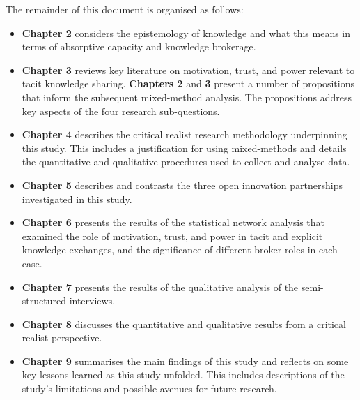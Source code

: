The remainder of this document is organised as follows:

\begin{itemize}[leftmargin=0pt]
    \item[] \textbf{Chapter 2} considers the epistemology of knowledge and what this means in terms of absorptive capacity and knowledge brokerage.
    \item[] \textbf{Chapter 3} reviews key literature on motivation, trust, and power relevant to tacit knowledge sharing. \textbf{Chapters 2} and \textbf{3} present a number of propositions that inform the subsequent mixed-method analysis. The propositions address key aspects of the four research sub-questions. 
    
    \item[] \textbf{Chapter 4} describes the critical realist research methodology underpinning this study. This includes a justification for using mixed-methods and details the quantitative and qualitative procedures used to collect and analyse data.
    \item[] \textbf{Chapter 5} describes and contrasts the three open innovation partnerships investigated in this study.
    \item[] \textbf{Chapter 6} presents the results of the statistical network analysis that examined the role of motivation, trust, and power in tacit and explicit knowledge exchanges, and the significance of different broker roles in each case.
    \item[] \textbf{Chapter 7} presents the results of the qualitative analysis of the semi-structured interviews.
    \item[] \textbf{Chapter 8} discusses the quantitative and qualitative results from a critical realist perspective. 
    \item[] \textbf{Chapter 9} summarises the main findings of this study and reflects on some key lessons learned as this study unfolded. This includes descriptions of the study's limitations and possible avenues for future research. 
\end{itemize}